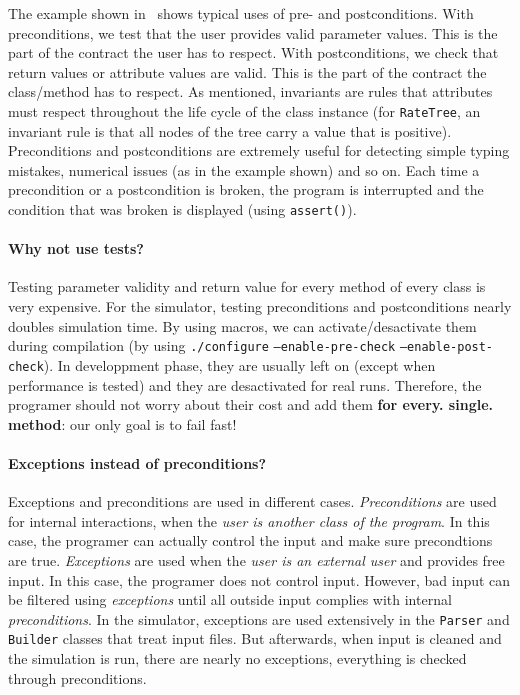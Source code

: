 The example shown in~ shows typical uses of pre- and postconditions. With preconditions, we test that the user provides valid parameter values. This is the part of the contract the user has to respect. With postconditions, we check that return values or attribute values are valid. This is the part of the contract the class/method has to respect. As mentioned, invariants are rules that attributes must respect throughout the life cycle of the class instance (for \texttt{RateTree}, an invariant rule is that all nodes of the tree carry a value that is positive). Preconditions and postconditions are extremely useful for detecting simple typing mistakes, numerical issues (as in the example shown) and so on. Each time a precondition or a postcondition is broken, the program is interrupted and the condition that was broken is displayed (using \texttt{assert()}).

\paragraph{Why not use tests?} Testing parameter validity and return value for every method of every class is very expensive. For the simulator, testing preconditions and postconditions nearly doubles simulation time. By using macros, we can activate/desactivate them during compilation (by using \texttt{./configure} \texttt{--enable-pre-check} \texttt{--enable-post-check}). In developpment phase, they are usually left on (except when performance is tested) and they are desactivated for real runs. Therefore, the programer should not worry about their cost and add them \textbf{for every. single. method}: our only goal is to fail fast!

\paragraph{Exceptions instead of preconditions?} Exceptions and preconditions are used in different cases. \emph{Preconditions} are used for internal interactions, when the \emph{user is another class of the program}. In this case, the programer can actually control the input and make sure precondtions are true. \emph{Exceptions} are used when the \emph{user is an external user} and provides free input. In this case, the programer does not control input. However, bad input can be filtered using \emph{exceptions} until all outside input complies with internal \emph{preconditions}. In the simulator, exceptions are used extensively in the \texttt{Parser} and \texttt{Builder} classes that treat input files. But afterwards, when input is cleaned and the simulation is run, there are nearly no exceptions, everything is checked through preconditions.

